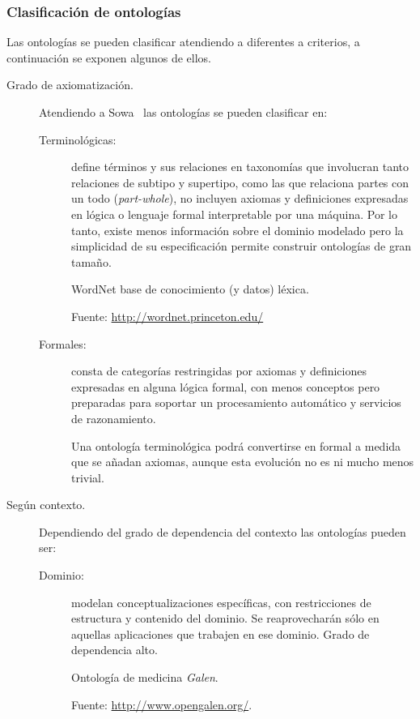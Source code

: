 \subsubsection{Clasificación de ontologías}
Las ontologías se pueden clasificar atendiendo a diferentes a criterios, a
continuación se exponen algunos de ellos.
\begin{description}
 \item [Grado de axiomatización.] Atendiendo a Sowa~\cite{Sowa99knowledge} las ontologías se pueden clasificar en:
\begin{description}
\item[Terminológicas:] define términos y sus relaciones en taxonomías que
involucran tanto relaciones de subtipo y supertipo, como las que relaciona
partes con un todo (\textit{part-whole}), no incluyen axiomas y definiciones
expresadas en lógica o lenguaje formal interpretable por una máquina. Por lo
tanto, existe menos información sobre el dominio modelado pero la simplicidad de
su especificación permite construir ontologías de gran tamaño.
\begin{example}
WordNet base de conocimiento (y datos) léxica.


Fuente: \url{http://wordnet.princeton.edu/}
\end{example}

\item[Formales:] consta de categorías restringidas por axiomas y definiciones
expresadas en alguna lógica formal, con menos conceptos pero preparadas para soportar
un procesamiento automático y servicios de razonamiento.

Una ontología terminológica podrá convertirse en formal a medida que se añadan
axiomas, aunque esta evolución no es ni mucho menos trivial.
\end{description}

\item[Según contexto.] Dependiendo del grado de dependencia del contexto las ontologías pueden ser:
\begin{description}
\item[Dominio:] modelan conceptualizaciones específicas, con restricciones de
estructura y contenido del dominio. Se reaprovecharán sólo en aquellas
aplicaciones que trabajen en ese dominio. Grado de dependencia alto.

\begin{example}
Ontología de medicina \textit{Galen}.


Fuente: \url{http://www.opengalen.org/}.
\end{example}


\end{description}
\end{description}
